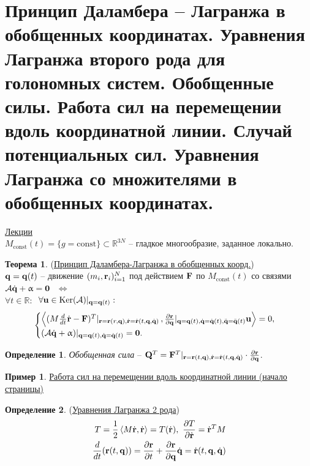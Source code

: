 \documentclass[specialist, subf, href, colorlinks=true, 12pt, times, mtpro, final]{disser}
\theoremstyle{definition}
\newtheorem{defn}{Определение}[section]
\newtheorem{example}{Пример}[section]
\newtheorem{theorem}{Теорема}[section]
\def\const{\text{const}}
\def\Ker{\text{Ker}}
\def\bfrd{\dot{\bfr}}
\def\bfqd{\dot{\bfq}}
\def\bfqdd{\ddot{\bfq}}
\def\bfalpha{\upalpha}
\def\bfzero{\mathbf{0}}
\begin{document}
	\section{Принцип Даламбера – Лагранжа в обобщенных координатах. Уравнения Лагранжа второго рода для голономных систем. Обобщенные силы. Работа сил на перемещении вдоль координатной линии. Случай потенциальных сил. Уравнения Лагранжа со множителями в обобщенных координатах.}
	 \label{3}
	\hyperlink {first_lects.14}{Лекции}\\
	$M_{\const}(t) = \{g = \const\} \subset \mathbb{R}^{3N}$ -- гладкое многообразие, заданное локально.
    \begin{theorem} (\hyperlink{first_lects.14}{Принцип Даламбера-Лагранжа в обобщенных коорд.})\\
    $\mathbf{q}=\mathbf{q}(t)$ -- движение $(m_i, \mathbf{r}_i)_{i=1}^N$ под действием $\mathbf{F}$ по
    $M_{\const}(t)$ со связями $\mathcal{A}\bfqd+\bfalpha=\bfzero\,\,$
    $\Longleftrightarrow$\\ $\forall t\in\mathbb{R}:\,$
    $\forall \bfu\in \Ker(\mathcal{A})|_{\bfq=\bfq(t)}:$
    $$
    \begin{cases}
    \left\langle(M\frac{d}{dt}\bfrd-\bfF)^T|_{\bfr=\bfr(r,\bfq),\bfrd=\bfrd(t,\bfq,\bfqd)}\,, \frac{\partial\bfr}{\partial\bfq}|_{\bfq=\bfq(t),\bfqd=\bfqd(t),\bfqdd=\bfqdd(t)}\bfu\right\rangle = 0, \\
    (\mathcal{A}\bfqd+\bfalpha)|_{\bfq=\bfq(t),\bfqd=\bfqd(t)} = \bfzero.\\
    \end{cases}
    $$
    \end{theorem}
    \begin{defn}
    {\it Обобщенная сила} -- $\bfQ^T = \bfF^T|_{\bfr=\bfr(t,\bfq),\bfrd=\bfrd(t,\bfq,\bfqd)}\cdot\frac{\partial\bfr}{\partial\bfq}$.
    \end{defn}
    \begin{example} \hyperlink{first_lects.15}{Работа сил на перемещении вдоль координатной линии (начало страницы)}
    \end{example}
    \begin{defn} (\hyperlink{first_lects.15}{Уравнения Лагранжа 2 рода})
    $$
    \begin{aligned}
    T = \frac{1}{2}\left\langle M\bfrd,\bfrd\right\rangle = T(\bfrd),\,\,
    \frac{\partial T}{\partial\bfrd} = \bfrd^T M\\
    \frac{d}{dt}(\bfr(t,\bfq))=\frac{\partial\bfr}{\partial t} + \frac{\partial\bfr}{\partial\bfq}\bfqd = \bfrd(t,\bfq,\bfqd)
    \end{aligned}
    $$
    \end{defn}
\end{document}
